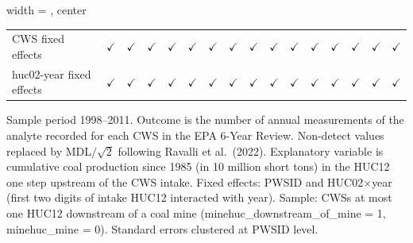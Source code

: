 \begin{table}[htbp]
\begin{adjustbox}{width = \textwidth, center}
\begin{tabular}{lccccccccccccccc}
          \\
         
         CWS fixed effects                   & $\checkmark$      & $\checkmark$       & $\checkmark$      & $\checkmark$      & $\checkmark$       & $\checkmark$      & $\checkmark$      & $\checkmark$       & $\checkmark$      & $\checkmark$      & $\checkmark$          & $\checkmark$          & $\checkmark$      & $\checkmark$       & $\checkmark$\\   
         huc02-year fixed effects            & $\checkmark$      & $\checkmark$       & $\checkmark$      & $\checkmark$      & $\checkmark$       & $\checkmark$      & $\checkmark$      & $\checkmark$       & $\checkmark$      & $\checkmark$      & $\checkmark$          & $\checkmark$          & $\checkmark$      & $\checkmark$       & $\checkmark$\\   
         
         \bottomrule
         
      \end{tabular}
      
      
      
   \end{adjustbox}
      {\tiny\linespread{1}\selectfont \par \raggedright 
   Sample period 1998--2011. Outcome is the number of annual measurements of the analyte recorded for each CWS in the EPA 6-Year Review. Non-detect values replaced by MDL$/\sqrt{2}$ following Ravalli et al.~(2022). Explanatory variable is cumulative coal production since 1985 (in 10 million short tons) in the HUC12 one step upstream of the CWS intake. Fixed effects: PWSID and HUC02$\times$year (first two digits of intake HUC12 interacted with year). Sample: CWSs at most one HUC12 downstream of a coal mine (minehuc\_downstream\_of\_mine = 1, minehuc\_mine = 0). Standard errors clustered at PWSID level.}
   
\end{table}


